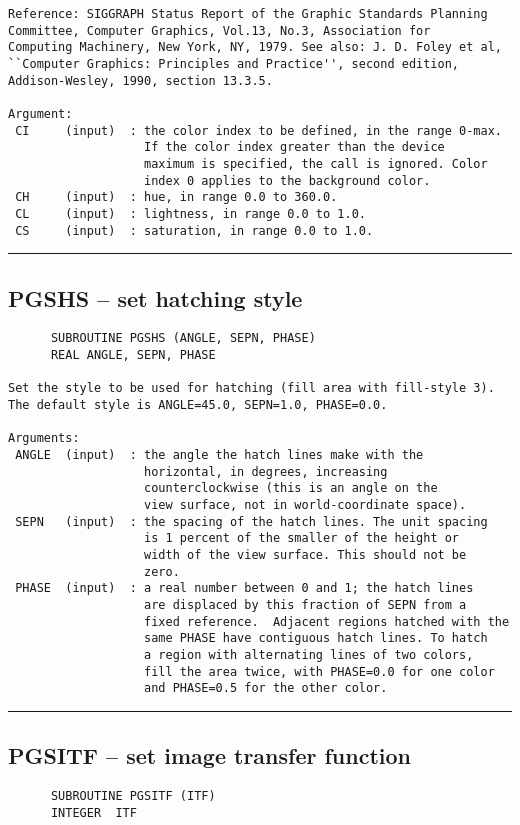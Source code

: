 {\begin{verbatim}
Reference: SIGGRAPH Status Report of the Graphic Standards Planning
Committee, Computer Graphics, Vol.13, No.3, Association for
Computing Machinery, New York, NY, 1979. See also: J. D. Foley et al,
``Computer Graphics: Principles and Practice'', second edition,
Addison-Wesley, 1990, section 13.3.5.

Argument:
 CI     (input)  : the color index to be defined, in the range 0-max.
                   If the color index greater than the device
                   maximum is specified, the call is ignored. Color
                   index 0 applies to the background color.
 CH     (input)  : hue, in range 0.0 to 360.0.
 CL     (input)  : lightness, in range 0.0 to 1.0.
 CS     (input)  : saturation, in range 0.0 to 1.0.
\end{verbatim}
\hrule


\subsection*{PGSHS -- set hatching style }
\begin{verbatim}
      SUBROUTINE PGSHS (ANGLE, SEPN, PHASE)
      REAL ANGLE, SEPN, PHASE

Set the style to be used for hatching (fill area with fill-style 3).
The default style is ANGLE=45.0, SEPN=1.0, PHASE=0.0.

Arguments:
 ANGLE  (input)  : the angle the hatch lines make with the
                   horizontal, in degrees, increasing 
                   counterclockwise (this is an angle on the
                   view surface, not in world-coordinate space).
 SEPN   (input)  : the spacing of the hatch lines. The unit spacing
                   is 1 percent of the smaller of the height or
                   width of the view surface. This should not be
                   zero.
 PHASE  (input)  : a real number between 0 and 1; the hatch lines
                   are displaced by this fraction of SEPN from a
                   fixed reference.  Adjacent regions hatched with the
                   same PHASE have contiguous hatch lines. To hatch
                   a region with alternating lines of two colors,
                   fill the area twice, with PHASE=0.0 for one color
                   and PHASE=0.5 for the other color.
\end{verbatim}
\hrule


\subsection*{PGSITF -- set image transfer function }
\begin{verbatim}
      SUBROUTINE PGSITF (ITF)
      INTEGER  ITF


\end{verbatim}}
